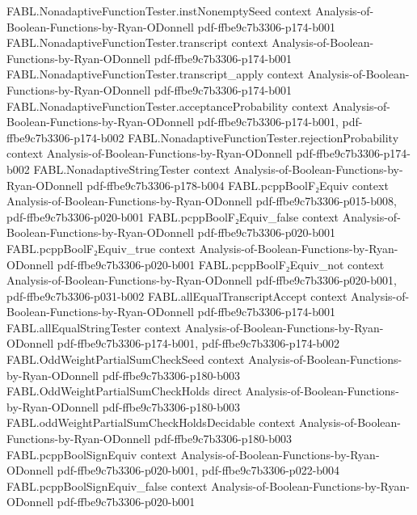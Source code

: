 \begin{theorem}
\proofstep
  {FABL.NonadaptiveFunctionTester.instNonemptySeed}
  {context}
  {Analysis-of-Boolean-Functions-by-Ryan-ODonnell}
  {pdf-ffbe9c7b3306-p174-b001}
\proofstep
  {FABL.NonadaptiveFunctionTester.transcript}
  {context}
  {Analysis-of-Boolean-Functions-by-Ryan-ODonnell}
  {pdf-ffbe9c7b3306-p174-b001}
\proofstep
  {FABL.NonadaptiveFunctionTester.transcript_apply}
  {context}
  {Analysis-of-Boolean-Functions-by-Ryan-ODonnell}
  {pdf-ffbe9c7b3306-p174-b001}
\proofstep
  {FABL.NonadaptiveFunctionTester.acceptanceProbability}
  {context}
  {Analysis-of-Boolean-Functions-by-Ryan-ODonnell}
  {pdf-ffbe9c7b3306-p174-b001,
    pdf-ffbe9c7b3306-p174-b002}
\proofstep
  {FABL.NonadaptiveFunctionTester.rejectionProbability}
  {context}
  {Analysis-of-Boolean-Functions-by-Ryan-ODonnell}
  {pdf-ffbe9c7b3306-p174-b002}
\proofstep
  {FABL.NonadaptiveStringTester}
  {context}
  {Analysis-of-Boolean-Functions-by-Ryan-ODonnell}
  {pdf-ffbe9c7b3306-p178-b004}
\proofstep
  {FABL.pcppBoolF₂Equiv}
  {context}
  {Analysis-of-Boolean-Functions-by-Ryan-ODonnell}
  {pdf-ffbe9c7b3306-p015-b008,
    pdf-ffbe9c7b3306-p020-b001}
\proofstep
  {FABL.pcppBoolF₂Equiv_false}
  {context}
  {Analysis-of-Boolean-Functions-by-Ryan-ODonnell}
  {pdf-ffbe9c7b3306-p020-b001}
\proofstep
  {FABL.pcppBoolF₂Equiv_true}
  {context}
  {Analysis-of-Boolean-Functions-by-Ryan-ODonnell}
  {pdf-ffbe9c7b3306-p020-b001}
\proofstep
  {FABL.pcppBoolF₂Equiv_not}
  {context}
  {Analysis-of-Boolean-Functions-by-Ryan-ODonnell}
  {pdf-ffbe9c7b3306-p020-b001,
    pdf-ffbe9c7b3306-p031-b002}
\proofstep
  {FABL.allEqualTranscriptAccept}
  {context}
  {Analysis-of-Boolean-Functions-by-Ryan-ODonnell}
  {pdf-ffbe9c7b3306-p174-b001}
\proofstep
  {FABL.allEqualStringTester}
  {context}
  {Analysis-of-Boolean-Functions-by-Ryan-ODonnell}
  {pdf-ffbe9c7b3306-p174-b001,
    pdf-ffbe9c7b3306-p174-b002}
\proofstep
  {FABL.OddWeightPartialSumCheckSeed}
  {context}
  {Analysis-of-Boolean-Functions-by-Ryan-ODonnell}
  {pdf-ffbe9c7b3306-p180-b003}
\proofstep
  {FABL.OddWeightPartialSumCheckHolds}
  {direct}
  {Analysis-of-Boolean-Functions-by-Ryan-ODonnell}
  {pdf-ffbe9c7b3306-p180-b003}
\proofstep
  {FABL.oddWeightPartialSumCheckHoldsDecidable}
  {context}
  {Analysis-of-Boolean-Functions-by-Ryan-ODonnell}
  {pdf-ffbe9c7b3306-p180-b003}
\proofstep
  {FABL.pcppBoolSignEquiv}
  {context}
  {Analysis-of-Boolean-Functions-by-Ryan-ODonnell}
  {pdf-ffbe9c7b3306-p020-b001,
    pdf-ffbe9c7b3306-p022-b004}
\proofstep
  {FABL.pcppBoolSignEquiv_false}
  {context}
  {Analysis-of-Boolean-Functions-by-Ryan-ODonnell}
  {pdf-ffbe9c7b3306-p020-b001}

\end{theorem}
